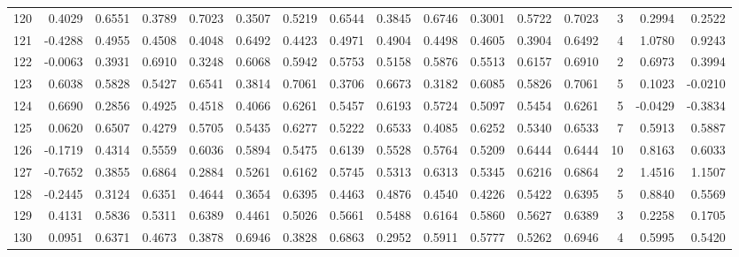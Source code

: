 \begin{tabular}{lrrrrrrrrrrrrrrr}
120 &      0.4029 &  0.6551 &  0.3789 &  0.7023 &  0.3507 &  0.5219 &  0.6544 &  0.3845 &  0.6746 &  0.3001 &   0.5722 &     0.7023 &      3 &                    0.2994 &                     0.2522 \\
121 &     -0.4288 &  0.4955 &  0.4508 &  0.4048 &  0.6492 &  0.4423 &  0.4971 &  0.4904 &  0.4498 &  0.4605 &   0.3904 &     0.6492 &      4 &                    1.0780 &                     0.9243 \\
122 &     -0.0063 &  0.3931 &  0.6910 &  0.3248 &  0.6068 &  0.5942 &  0.5753 &  0.5158 &  0.5876 &  0.5513 &   0.6157 &     0.6910 &      2 &                    0.6973 &                     0.3994 \\
123 &      0.6038 &  0.5828 &  0.5427 &  0.6541 &  0.3814 &  0.7061 &  0.3706 &  0.6673 &  0.3182 &  0.6085 &   0.5826 &     0.7061 &      5 &                    0.1023 &                    -0.0210 \\
124 &      0.6690 &  0.2856 &  0.4925 &  0.4518 &  0.4066 &  0.6261 &  0.5457 &  0.6193 &  0.5724 &  0.5097 &   0.5454 &     0.6261 &      5 &                   -0.0429 &                    -0.3834 \\
125 &      0.0620 &  0.6507 &  0.4279 &  0.5705 &  0.5435 &  0.6277 &  0.5222 &  0.6533 &  0.4085 &  0.6252 &   0.5340 &     0.6533 &      7 &                    0.5913 &                     0.5887 \\
126 &     -0.1719 &  0.4314 &  0.5559 &  0.6036 &  0.5894 &  0.5475 &  0.6139 &  0.5528 &  0.5764 &  0.5209 &   0.6444 &     0.6444 &     10 &                    0.8163 &                     0.6033 \\
127 &     -0.7652 &  0.3855 &  0.6864 &  0.2884 &  0.5261 &  0.6162 &  0.5745 &  0.5313 &  0.6313 &  0.5345 &   0.6216 &     0.6864 &      2 &                    1.4516 &                     1.1507 \\
128 &     -0.2445 &  0.3124 &  0.6351 &  0.4644 &  0.3654 &  0.6395 &  0.4463 &  0.4876 &  0.4540 &  0.4226 &   0.5422 &     0.6395 &      5 &                    0.8840 &                     0.5569 \\
129 &      0.4131 &  0.5836 &  0.5311 &  0.6389 &  0.4461 &  0.5026 &  0.5661 &  0.5488 &  0.6164 &  0.5860 &   0.5627 &     0.6389 &      3 &                    0.2258 &                     0.1705 \\
130 &      0.0951 &  0.6371 &  0.4673 &  0.3878 &  0.6946 &  0.3828 &  0.6863 &  0.2952 &  0.5911 &  0.5777 &   0.5262 &     0.6946 &      4 &                    0.5995 &                     0.5420 \\

\end{tabular}
